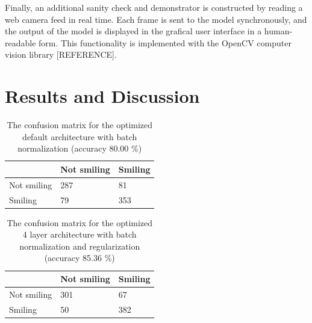 \documentclass{article}
\begin{document}
Finally, an additional sanity check and demonstrator is constructed by
reading a web camera feed in real time. Each frame is sent to the
model synchronously, and the output of the model is displayed in the
grafical user interface in a human-readable form. This functionality
is implemented with the OpenCV computer vision library [REFERENCE].

\section{Results and Discussion}\label{sec:results}


\begin{table}[t]
\centering
\caption{The confusion matrix for the optimized default architecture
  with batch normalization (accuracy 80.00 \%)}\label{tab:default-confusion}
\begin{tabular}{lll}
\hline
                                 & Not smiling & Smiling \\ \hline
\multicolumn{1}{l|}{Not smiling} & 287         & 81      \\
\multicolumn{1}{l|}{Smiling}     & 79          & 353     \\ \hline
\end{tabular}
\end{table}

\begin{table}[t]
\centering
\caption{The confusion matrix for the optimized 4 layer architecture
  with batch normalization and regularization (accuracy 85.36
  \%)}\label{tab:best-confusion}
\begin{tabular}{lll}
\hline
                                 & Not smiling & Smiling \\ \hline
\multicolumn{1}{l|}{Not smiling} & 301         & 67     \\
\multicolumn{1}{l|}{Smiling}     & 50          & 382     \\ \hline
\end{tabular}
\end{table}
\end{document}
